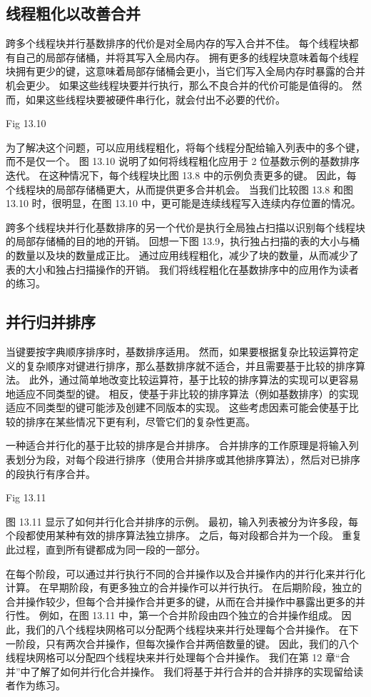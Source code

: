 \subsection{线程粗化以改善合并}
跨多个线程块并行基数排序的代价是对全局内存的写入合并不佳。 每个线程块都有自己的局部存储桶，并将其写入全局内存。 
拥有更多的线程块意味着每个线程块拥有更少的键，这意味着局部存储桶会更小，当它们写入全局内存时暴露的合并机会更少。 
如果这些线程块要并行执行，那么不良合并的代价可能是值得的。 然而，如果这些线程块要被硬件串行化，就会付出不必要的代价。

{\color{red} Fig 13.10}

为了解决这个问题，可以应用线程粗化，将每个线程分配给输入列表中的多个键，而不是仅一个。 
图 13.10 说明了如何将线程粗化应用于 2 位基数示例的基数排序迭代。 
在这种情况下，每个线程块比图 13.8 中的示例负责更多的键。 因此，每个线程块的局部存储桶更大，从而提供更多合并机会。 
当我们比较图 13.8 和图 13.10 时，很明显，在图 13.10 中，更可能是连续线程写入连续内存位置的情况。

跨多个线程块并行化基数排序的另一个代价是执行全局独占扫描以识别每个线程块的局部存储桶的目的地的开销。 
回想一下图 13.9，执行独占扫描的表的大小与桶的数量以及块的数量成正比。 
通过应用线程粗化，减少了块的数量，从而减少了表的大小和独占扫描操作的开销。 我们将线程粗化在基数排序中的应用作为读者的练习。

\subsection{并行归并排序}
当键要按字典顺序排序时，基数排序适用。 
然而，如果要根据复杂比较运算符定义的复杂顺序对键进行排序，那么基数排序就不适合，并且需要基于比较的排序算法。 
此外，通过简单地改变比较运算符，基于比较的排序算法的实现可以更容易地适应不同类型的键。 
相反，使基于非比较的排序算法（例如基数排序）的实现适应不同类型的键可能涉及创建不同版本的实现。 
这些考虑因素可能会使基于比较的排序在某些情况下更有利，尽管它们的复杂性更高。

一种适合并行化的基于比较的排序是合并排序。 
合并排序的工作原理是将输入列表划分为段，对每个段进行排序（使用合并排序或其他排序算法），然后对已排序的段执行有序合并。

{\color{red} Fig 13.11}

图 13.11 显示了如何并行化合并排序的示例。 最初，输入列表被分为许多段，每个段都使用某种有效的排序算法独立排序。 
之后，每对段都合并为一个段。 重复此过程，直到所有键都成为同一段的一部分。

在每个阶段，可以通过并行执行不同的合并操作以及合并操作内的并行化来并行化计算。 
在早期阶段，有更多独立的合并操作可以并行执行。 
在后期阶段，独立的合并操作较少，但每个合并操作合并更多的键，从而在合并操作中暴露出更多的并行性。 
例如，在图 13.11 中，第一个合并阶段由四个独立的合并操作组成。 
因此，我们的八个线程块网格可以分配两个线程块来并行处理每个合并操作。 
在下一阶段，只有两次合并操作，但每次操作合并两倍数量的键。 
因此，我们的八个线程块网格可以分配四个线程块来并行处理每个合并操作。 我们在第 12 章“合并”中了解了如何并行化合并操作。 
我们将基于并行合并的合并排序的实现留给读者作为练习。

